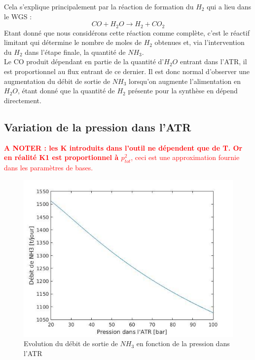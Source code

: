 \documentclass[12pt]{report}
\begin{document}
Cela s'explique principalement par la réaction de formation du $H_2$ qui a lieu dans le WGS : 
\begin{equation}
CO + H_2O \rightarrow H_2 + CO_2
\end{equation}
Etant donné que nous considérons cette réaction comme complète,  c'est le réactif limitant qui détermine le nombre de moles de $H_2$ obtenues et, via l'intervention du $H_2$ dans l'étape finale, la quantité de $NH_3$.\\

Le CO produit dépendant en partie de la quantité d'$H_2O$ entrant dans l'ATR, il est proportionnel au flux entrant de ce dernier. Il est donc normal d'observer une augmentation du débit de sortie de $NH_3$ lorsqu'on augmente l'alimentation en $H_2O$, étant donné que la quantité de $H_2$ présente pour la synthèse en dépend directement.\\

\subsection{Variation de la pression dans l'ATR}

\textcolor{red}{\textbf{A NOTER : les K introduits dans l'outil ne dépendent que de T. Or en réalité K1 est proportionnel à $p_{tot}^2$}, ceci est une approximation fournie dans les paramètres de bases.\\}

\begin{figure}[H]
\begin{center}
\includegraphics[scale=0.6]{debit_NH3_pression_ATR}
\caption{Evolution du débit de sortie de $NH_3$ en fonction de la pression dans l'ATR}
\end{center}
\end{figure}
\end{document}
